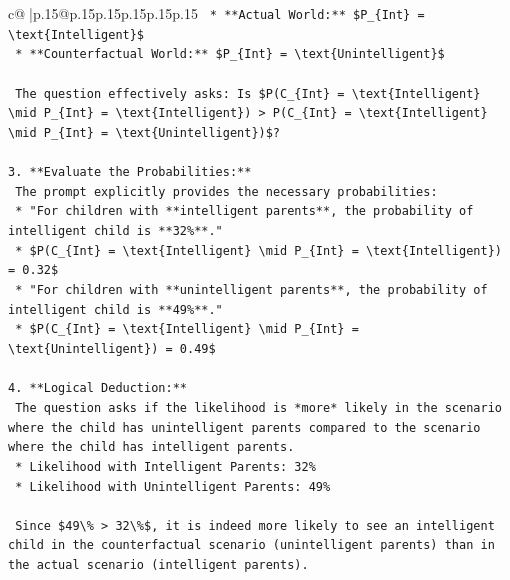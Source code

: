 \documentclass{article}
\begin{document}
{\begin{supertabular}{c@{$\;$}|p{.15\linewidth}@{}p{.15\linewidth}p{.15\linewidth}p{.15\linewidth}p{.15\linewidth}p{.15\linewidth}}
{{{\texttt{    *   **Actual World:** \$P\_\{Int\} = \textbackslash{}text\{Intelligent\}\$} \\
\texttt{    *   **Counterfactual World:** \$P\_\{Int\} = \textbackslash{}text\{Unintelligent\}\$} \\
\\ 
\texttt{    The question effectively asks: Is \$P(C\_\{Int\} = \textbackslash{}text\{Intelligent\} \textbackslash{}mid P\_\{Int\} = \textbackslash{}text\{Intelligent\}) > P(C\_\{Int\} = \textbackslash{}text\{Intelligent\} \textbackslash{}mid P\_\{Int\} = \textbackslash{}text\{Unintelligent\})\$?} \\
\\ 
\texttt{3.  **Evaluate the Probabilities:**} \\
\texttt{    The prompt explicitly provides the necessary probabilities:} \\
\texttt{    *   "For children with **intelligent parents**, the probability of intelligent child is **32\%**."} \\
\texttt{        *   \$P(C\_\{Int\} = \textbackslash{}text\{Intelligent\} \textbackslash{}mid P\_\{Int\} = \textbackslash{}text\{Intelligent\}) = 0.32\$} \\
\texttt{    *   "For children with **unintelligent parents**, the probability of intelligent child is **49\%**."} \\
\texttt{        *   \$P(C\_\{Int\} = \textbackslash{}text\{Intelligent\} \textbackslash{}mid P\_\{Int\} = \textbackslash{}text\{Unintelligent\}) = 0.49\$} \\
\\ 
\texttt{4.  **Logical Deduction:**} \\
\texttt{    The question asks if the likelihood is *more* likely in the scenario where the child has unintelligent parents compared to the scenario where the child has intelligent parents.} \\
\texttt{    *   Likelihood with Intelligent Parents: 32\%} \\
\texttt{    *   Likelihood with Unintelligent Parents: 49\%} \\
\\ 
\texttt{    Since \$49\textbackslash{}\% > 32\textbackslash{}\%\$, it is indeed more likely to see an intelligent child in the counterfactual scenario (unintelligent parents) than in the actual scenario (intelligent parents).} \\
\\ 
}}}
\end{supertabular}}
\end{document}

